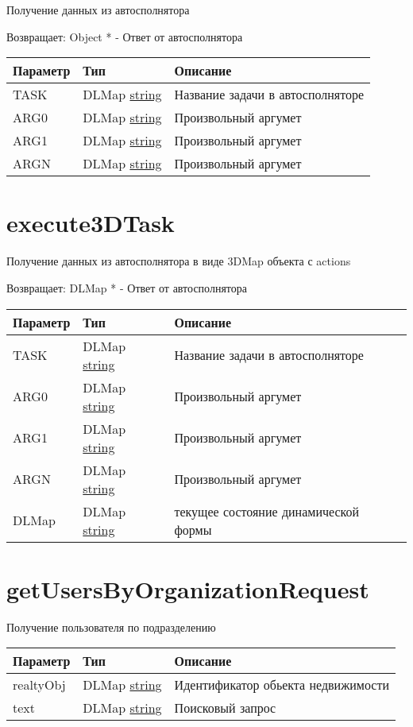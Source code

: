 Получение данных из автосполнятора

Возвращает: Object \textbar{} * - Ответ от автосполнятора

\begin{longtable}[]{@{}lll@{}}
\toprule
Параметр & Тип & Описание\tabularnewline
\midrule
\endhead
TASK & DLMap \textbar{} \protect\hyperlink{string}{string} & Название
задачи в автосполняторе\tabularnewline
ARG0 & DLMap \textbar{} \protect\hyperlink{string}{string} &
Произвольный аргумет\tabularnewline
ARG1 & DLMap \textbar{} \protect\hyperlink{string}{string} &
Произвольный аргумет\tabularnewline
ARGN & DLMap \textbar{} \protect\hyperlink{string}{string} &
Произвольный аргумет\tabularnewline
\bottomrule
\end{longtable}

\section{execute3DTask
\label{execute3dtasktask-arg0-arg1-argn-dlmap-object}}
Получение данных из автосполнятора в виде 3DMap объекта с actions

Возвращает: DLMap \textbar{} * - Ответ от автосполнятора

\begin{longtable}[]{@{}lll@{}}
\toprule
Параметр & Тип & Описание\tabularnewline
\midrule
\endhead
TASK & DLMap \textbar{} \protect\hyperlink{string}{string} & Название
задачи в автосполняторе\tabularnewline
ARG0 & DLMap \textbar{} \protect\hyperlink{string}{string} &
Произвольный аргумет\tabularnewline
ARG1 & DLMap \textbar{} \protect\hyperlink{string}{string} &
Произвольный аргумет\tabularnewline
ARGN & DLMap \textbar{} \protect\hyperlink{string}{string} &
Произвольный аргумет\tabularnewline
DLMap & DLMap \textbar{} \protect\hyperlink{string}{string} &
текущее состояние динамической формы\tabularnewline
\bottomrule
\end{longtable}

\hypertarget{getusersbyorganizationrequestrealtyobj-text-object}{%
\section{getUsersByOrganizationRequest}\label{getusersbyorganizationrequestrealtyobj-text-object}}

Получение пользователя по подразделению


\begin{longtable}[]{@{}lll@{}}
\toprule
Параметр & Тип & Описание\tabularnewline
\midrule
\endhead
realtyObj & DLMap \textbar{} \protect\hyperlink{string}{string} &
Идентификатор обьекта недвижимости\tabularnewline
text & DLMap \textbar{} \protect\hyperlink{string}{string} & Поисковый
запрос\tabularnewline
\bottomrule
\end{longtable}

